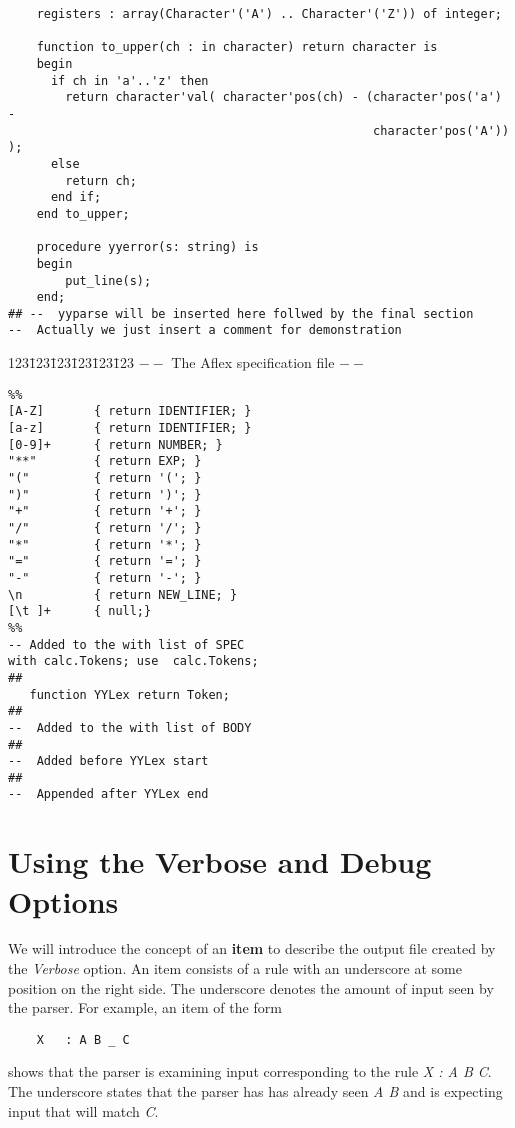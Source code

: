 \begin{verbatim}
    registers : array(Character'('A') .. Character'('Z')) of integer; 

    function to_upper(ch : in character) return character is
    begin
      if ch in 'a'..'z' then
        return character'val( character'pos(ch) - (character'pos('a') -
                                                   character'pos('A')) );
      else
        return ch;
      end if;
    end to_upper;

    procedure yyerror(s: string) is 
    begin 
        put_line(s); 
    end;
## --  yyparse will be inserted here follwed by the final section
--  Actually we just insert a comment for demonstration
\end{verbatim}
\normalsize
\newpage
\begin{tabbing}
123\=123\=123\=123\=123\=123 \kill
\>\>\>\>                 $--$ The Aflex specification file  $--$\\
\end{tabbing}
\small
\begin{verbatim}
%% 
[A-Z]       { return IDENTIFIER; }
[a-z]       { return IDENTIFIER; }
[0-9]+      { return NUMBER; }
"**"        { return EXP; }
"("         { return '('; }
")"         { return ')'; }
"+"         { return '+'; }
"/"         { return '/'; }
"*"         { return '*'; }
"="         { return '='; }
"-"         { return '-'; }
\n          { return NEW_LINE; }
[\t ]+      { null;} 
%%
-- Added to the with list of SPEC
with calc.Tokens; use  calc.Tokens;
##
   function YYLex return Token;
##
--  Added to the with list of BODY
##
--  Added before YYLex start
##
--  Appended after YYLex end
\end{verbatim}
\normalsize
\newpage
\newpage
\section{Using the Verbose and Debug Options}
We will introduce the concept of an {\bf item} to describe the output file
created by the {\it Verbose} option.  An item consists of a rule with
an underscore at some position on the right side.  The underscore denotes
the amount of input seen by the parser.  For example, an item of the form
\begin{verbatim}
    X   : A B _ C
\end{verbatim}
shows that the parser is examining input corresponding to the rule
{\it X : A B C}.
The underscore states that the parser has has already seen
{\it A B}
and is expecting input that will match
{\it C}.

